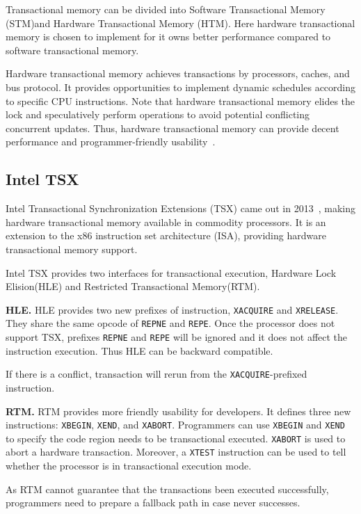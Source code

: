 \documentclass[10pt]{llncs}
\begin{document}
Transactional memory can be divided into Software Transactional Memory (STM)and  Hardware Transactional Memory (HTM). Here hardware transactional memory is chosen to implement for it owns better performance compared to software transactional memory. 

Hardware transactional memory achieves transactions by processors, caches, and bus protocol\cite{Herlihy1993Transactional}. It provides opportunities to implement dynamic schedules according to specific CPU instructions. Note that hardware transactional memory elides the lock and speculatively perform operations to avoid potential conflicting concurrent updates. Thus, hardware transactional memory can provide decent performance and programmer-friendly usability~\cite{Karnagel2014Improving}.

\subsection{Intel TSX}
\label{back4}
Intel Transactional Synchronization Extensions (TSX) came out in 2013~\cite{Yoo2014Performance,Haas2014Enhancing,Goel2014Performance}, making hardware transactional memory available in commodity processors. It is an extension to the x86 instruction set architecture (ISA), providing hardware transactional memory support.

Intel TSX provides two interfaces for transactional execution, Hardware Lock Elision(HLE) and Restricted Transactional Memory(RTM).

\textbf{HLE.} HLE provides two new prefixes of instruction, \verb:XACQUIRE: and \verb:XRELEASE:. They share the same opcode of \verb:REPNE: and \verb:REPE:. Once the processor does not support TSX, prefixes \verb:REPNE: and \verb:REPE: will be ignored and it does not affect the instruction execution. Thus HLE can be backward compatible.

If there is a conflict, transaction will rerun from the \verb:XACQUIRE:-prefixed instruction.

\textbf{RTM.} RTM provides more friendly usability for developers. It defines three new instructions: \verb:XBEGIN:, \verb:XEND:, and \verb:XABORT:. Programmers can use \verb:XBEGIN: and \verb:XEND: to specify the code region needs to be transactional executed. \verb:XABORT: is used to abort a hardware transaction. Moreover, a \verb:XTEST: instruction can be used to tell whether the processor is in transactional execution mode.

As RTM cannot guarantee that the transactions been executed successfully, programmers need to prepare a fallback path in case never successes.
\end{document}
